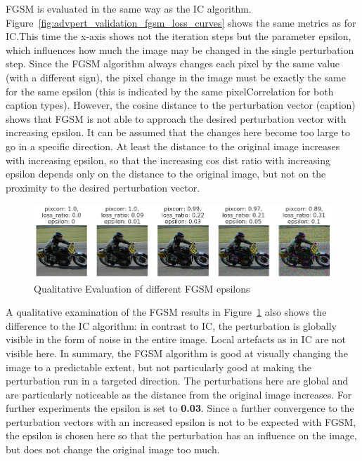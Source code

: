 FGSM is evaluated in the same way as the IC algorithm. Figure~\ref{fig:advpert_validation_fgsm_loss_curves} shows the same metrics as for IC.\@ This time the x-axis shows not the iteration steps but the parameter epsilon, which influences how much the image may be changed in the single perturbation step. Since the FGSM algorithm always changes each pixel by the same value (with a different sign), the pixel change in the image must be exactly the same for the same epsilon (this is indicated by the same pixelCorrelation for both caption types). However, the cosine distance to the perturbation vector (caption) shows that FGSM is not able to approach the desired perturbation vector with increasing epsilon. It can be assumed that the changes here become too large to go in a specific direction. At least the distance to the original image increases with increasing epsilon, so that the increasing cos dist ratio with increasing epsilon depends only on the distance to the original image, but not on the proximity to the desired perturbation vector. 

    \begin{figure}[ht]
        \centering
        \includegraphics[width=1\textwidth]{plots/advpert_fgsm_qual_validation_evolution.png}
        \caption{Qualitative Evaluation of different FGSM epsilons}\label{fig:advpert_fgsm_qual_validation_evolution}
    \end{figure}
    

A qualitative examination of the FGSM results in Figure~\ref{fig:advpert_fgsm_qual_validation_evolution} also shows the difference to the IC algorithm: in contrast to IC, the perturbation is globally visible in the form of noise in the entire image. Local artefacts as in IC are not visible here. In summary, the FGSM algorithm is good at visually changing the image to a predictable extent, but not particularly good at making the perturbation run in a targeted direction. The perturbations here are global and are particularly noticeable as the distance from the original image increases. For further experiments the epsilon is set to \textbf{0.03}. Since a further convergence to the perturbation vectors with an increased epsilon is not to be expected with FGSM, the epsilon is chosen here so that the perturbation has an influence on the image, but does not change the original image too much.

